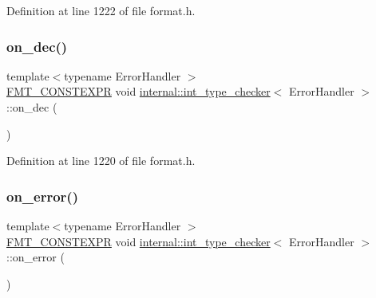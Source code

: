 Definition at line 1222 of file format.\+h.

\mbox{\label{classinternal_1_1int__type__checker_ad5b0a2534b245ce2c5065fb26a1ca862}} 
\subsubsection{\texorpdfstring{on\+\_\+dec()}{on\_dec()}}
{\footnotesize\ttfamily template$<$typename Error\+Handler $>$ \\
\hyperlink{core_8h_a69201cb276383873487bf68b4ef8b4cd}{F\+M\+T\+\_\+\+C\+O\+N\+S\+T\+E\+X\+PR} void \hyperlink{classinternal_1_1int__type__checker}{internal\+::int\+\_\+type\+\_\+checker}$<$ Error\+Handler $>$\+::on\+\_\+dec (\begin{DoxyParamCaption}{ }\end{DoxyParamCaption})\hspace{0.3cm}{\ttfamily [inline]}}



Definition at line 1220 of file format.\+h.

\mbox{\label{classinternal_1_1int__type__checker_a9da79c30a3dbabe952392ccdd9a45acb}} 
\subsubsection{\texorpdfstring{on\+\_\+error()}{on\_error()}}
{\footnotesize\ttfamily template$<$typename Error\+Handler $>$ \\
\hyperlink{core_8h_a69201cb276383873487bf68b4ef8b4cd}{F\+M\+T\+\_\+\+C\+O\+N\+S\+T\+E\+X\+PR} void \hyperlink{classinternal_1_1int__type__checker}{internal\+::int\+\_\+type\+\_\+checker}$<$ Error\+Handler $>$\+::on\+\_\+error (\begin{DoxyParamCaption}{ }\end{DoxyParamCaption})\hspace{0.3cm}{\ttfamily [inline]}}




